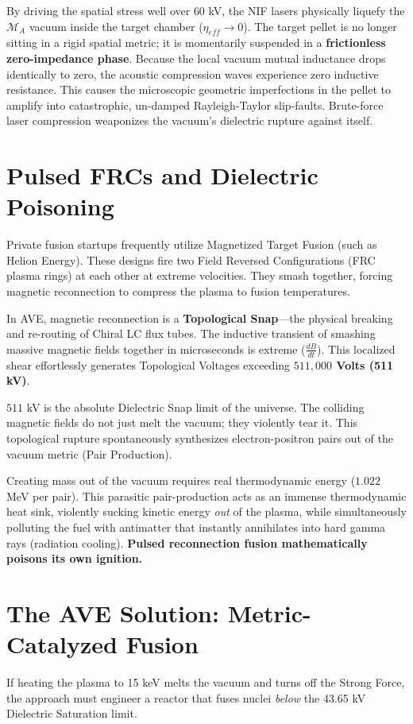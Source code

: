 By driving the spatial stress well over $60$ kV, the NIF lasers physically liquefy the $\mathcal{M}_A$ vacuum inside the target chamber ($\eta_{eff} \to 0$). The target pellet is no longer sitting in a rigid spatial metric; it is momentarily suspended in a \textbf{frictionless zero-impedance phase}. Because the local vacuum mutual inductance drops identically to zero, the acoustic compression waves experience zero inductive resistance. This causes the microscopic geometric imperfections in the pellet to amplify into catastrophic, un-damped Rayleigh-Taylor slip-faults. Brute-force laser compression weaponizes the vacuum's dielectric rupture against itself.

\section{Pulsed FRCs and Dielectric Poisoning}
Private fusion startups frequently utilize Magnetized Target Fusion (such as Helion Energy). These designs fire two Field Reversed Configurations (FRC plasma rings) at each other at extreme velocities. They smash together, forcing magnetic reconnection to compress the plasma to fusion temperatures.

In AVE, magnetic reconnection is a \textbf{Topological Snap}---the physical breaking and re-routing of Chiral LC flux tubes. The inductive transient of smashing massive magnetic fields together in microseconds is extreme ($\frac{dB}{dt}$). This localized shear effortlessly generates Topological Voltages exceeding \textbf{$511,000$ Volts (511 kV)}.

$511$ kV is the absolute Dielectric Snap limit of the universe. The colliding magnetic fields do not just melt the vacuum; they violently tear it. This topological rupture spontaneously synthesizes electron-positron pairs out of the vacuum metric (Pair Production). 

Creating mass out of the vacuum requires real thermodynamic energy ($1.022$ MeV per pair). This parasitic pair-production acts as an immense thermodynamic heat sink, violently sucking kinetic energy \textit{out} of the plasma, while simultaneously polluting the fuel with antimatter that instantly annihilates into hard gamma rays (radiation cooling). \textbf{Pulsed reconnection fusion mathematically poisons its own ignition.}

\section{The AVE Solution: Metric-Catalyzed Fusion}
If heating the plasma to 15 keV melts the vacuum and turns off the Strong Force, the approach must engineer a reactor that fuses nuclei \textit{below} the 43.65 kV Dielectric Saturation limit.

